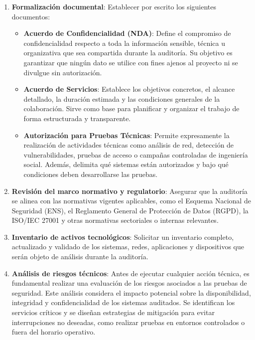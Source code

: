 \documentclass[a4paper, 11pt]{article}
\begin{document}
\begin{enumerate}
\item \textbf{Formalización documental}: Establecer por escrito los siguientes documentos:

\begin{itemize}
\item \textbf{Acuerdo de Confidencialidad (NDA)}: Define el compromiso de confidencialidad respecto a toda la información sensible, técnica u organizativa que sea compartida durante la auditoría. Su objetivo es garantizar que ningún dato se utilice con fines ajenos al proyecto ni se divulgue sin autorización.

\item \textbf{Acuerdo de Servicios}: Establece los objetivos concretos, el alcance detallado, la duración estimada y las condiciones generales de la colaboración. Sirve como base para planificar y organizar el trabajo de forma estructurada y transparente.

\item \textbf{Autorización para Pruebas Técnicas}: Permite expresamente la realización de actividades técnicas como análisis de red, detección de vulnerabilidades, pruebas de acceso o campañas controladas de ingeniería social. Además, delimita qué sistemas están autorizados y bajo qué condiciones deben desarrollarse las pruebas.
\end{itemize}

\item \textbf{Revisión del marco normativo y regulatorio}: Asegurar que la auditoría se alinea con las normativas vigentes aplicables, como el Esquema Nacional de Seguridad (ENS), el Reglamento General de Protección de Datos (RGPD), la ISO/IEC 27001 y otras normativas sectoriales o internas relevantes.

\item \textbf{Inventario de activos tecnológicos}: Solicitar un inventario completo, actualizado y validado de los sistemas, redes, aplicaciones y dispositivos que serán objeto de análisis durante la auditoría.

\item \textbf{Análisis de riesgos técnicos}: Antes de ejecutar cualquier acción técnica, es fundamental realizar una evaluación de los riesgos asociados a las pruebas de seguridad. Este análisis considera el impacto potencial sobre la disponibilidad, integridad y confidencialidad de los sistemas auditados. Se identifican los servicios críticos y se diseñan estrategias de mitigación para evitar interrupciones no deseadas, como realizar pruebas en entornos controlados o fuera del horario operativo.


\end{enumerate}
\end{document}
